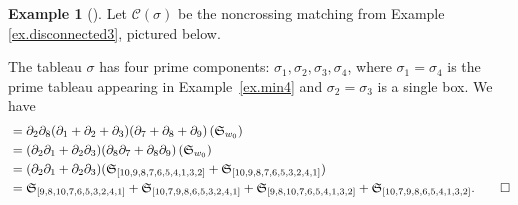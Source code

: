 \documentclass[11pt]{amsart}
\theoremstyle{remark}
\theoremstyle{remark}
\theoremstyle{definition}
\theoremstyle{definition}
\theoremstyle{definition}
\newtheorem{eg_no_qed}[theorem]{Example}
\newenvironment{ex}[1][]{\begin{eg_no_qed}[#1]\renewcommand{\qedsymbol}{$\Diamond$}\pushQED{\qed}}{\popQED\end{eg_no_qed}}
\numberwithin{equation}{section}
\newcommand{\gs}{\sigma}
\newcommand{\cb}{\mathcal{B}}
\newcommand{\cc}{\mathcal{C}}
\newcommand{\cupsigma}{\cc(\gs)}
\begin{document}
\begin{ex}
Let $\cupsigma$ be the noncrossing matching from Example \ref{ex.disconnected3}, pictured below.
\begin{figure}[h!]
\end{figure}
\noindent The tableau $\gs$ has four prime components: $\gs_1, \gs_2, \gs_3, \gs_4$, where $\gs_1=\gs_4$ is the prime tableau appearing in Example~\ref{ex.min4} and $\gs_2=\gs_3$ is a single box. We have
\begin{align*}
[\cb_\gs]&=\partial_2\partial_8 (\partial_1+\partial_2+\partial_3)(\partial_7+\partial_8+\partial_9)\left(\mathfrak{S}_{w_0}\right) \\
&=(\partial_2\partial_1+\partial_2\partial_3)(\partial_8\partial_7+\partial_8\partial_9)\left(\mathfrak{S}_{w_0}\right)\\
&=(\partial_2\partial_1+\partial_2\partial_3)(\mathfrak{S}_{[10,9,8,7,6,5,4,1,3,2]}+ \mathfrak{S}_{[10,9,8,7,6,5,3,2,4,1]}) \\
&=\mathfrak{S}_{[9,8,10,7,6,5,3,2,4,1]}+\mathfrak{S}_{[10,7,9,8,6,5,3,2,4,1]}+\mathfrak{S}_{[9,8,10,7,6,5,4,1,3,2]}+\mathfrak{S}_{[10,7,9,8,6,5,4,1,3,2]}. \qedhere
\end{align*}
\end{ex}
\end{document}
